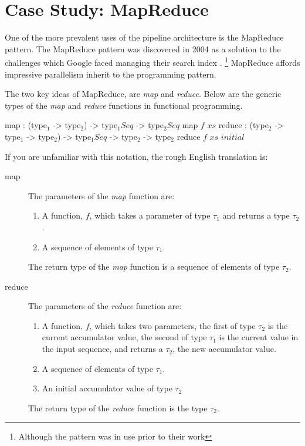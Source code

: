 \documentclass{csse4400}
\begin{document}
\section{Case Study: MapReduce}

One of the more prevalent uses of the pipeline architecture is the MapReduce pattern.
The MapReduce pattern was discovered in 2004 as a solution to the challenges which Google faced managing their search index \cite{mapreduce}.%
\footnote{Although the pattern was in use prior to their work\cite{mapreduce-critique}} %
MapReduce affords impressive parallelism inherit to the programming pattern.

The two key ideas of MapReduce, are \textsl{map} and \textsl{reduce}.
Below are the generic types of the \textsl{map} and \textsl{reduce} functions in functional programming.

\begin{code}[language=lambda]{}
map : (type$_1$ -> type$_2$) -> type$_1 Seq$ -> type$_2 Seq$
map $f$ $xs$
reduce : (type$_2$ -> type$_1$ -> type$_2$) -> type$_1 Seq$ -> type$_2$ -> type$_2$
reduce $f$ $xs$ $initial$
\end{code}

If you are unfamiliar with this notation, the rough English translation is:
\begin{description}
    \item[map] The parameters of the \textsl{map} function are:
        \begin{enumerate}[label=(\alph*)]
            \item A function, $f$, which takes a parameter of type $\tau_1$ and returns a type $\tau_2$.
            \item A sequence of elements of type $\tau_1$.
        \end{enumerate}
        The return type of the \textsl{map} function is a sequence of elements of type $\tau_2$.
    \item[reduce] The parameters of the \textsl{reduce} function are:
        \begin{enumerate}[label=(\alph*)]
            \item A function, $f$, which takes two parameters, the first of type $\tau_2$ is the current accumulator value, the second of type $\tau_1$ is the current value in the input sequence, and returns a $\tau_2$, the new accumulator value.
            \item A sequence of elements of type $\tau_1$.
            \item An initial accumulator value of type $\tau_2$
        \end{enumerate}
        The return type of the \textsl{reduce} function is the type $\tau_2$.
\end{description}
\end{document}
